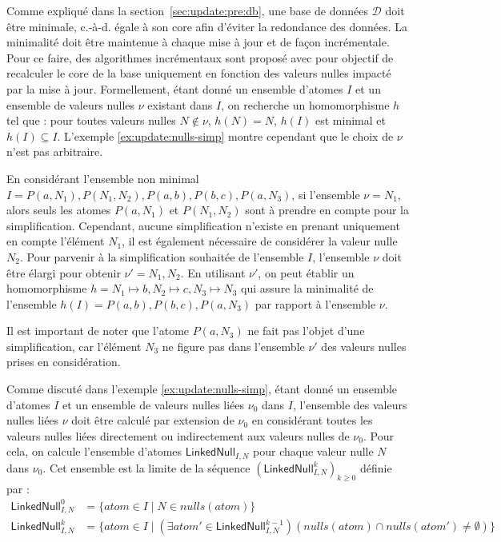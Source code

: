 Comme expliqué dans la section~\ref{sec:update:pre:db}, une base de données $\mathcal{D}$ doit être minimale, c.-à-d. égale à son \gls{core} afin d'éviter la redondance des données.
La minimalité doit être maintenue à chaque mise à jour et de façon incrémentale.
Pour ce faire, des algorithmes incrémentaux sont proposé avec pour objectif de recalculer le \gls{core}  de la base uniquement en fonction des valeurs nulles impacté par la mise à jour.
Formellement, étant donné un ensemble d'atomes $I$ et un ensemble de valeurs nulles $\nu$ existant dans $I$, on recherche un homomorphisme $h$ tel que : pour toutes valeurs nulles $N \notin \nu$, $h(N) = N$, $h(I)$ est minimal et $h(I) \subseteq I$.
L'exemple \ref{ex:update:nulls-simp} montre cependant que le choix de $\nu$ n'est pas arbitraire.

\begin{example}
	\label{ex:update:nulls-simp}
	En considérant l'ensemble non minimal $I = {P(a, N_1), P(N_1, N_2), P(a, b), P(b, c), P(a, N_3)}$, si l'ensemble $\nu = {N_1}$, alors seuls les atomes $P(a, N_1)$ et $P(N_1, N_2)$ sont à prendre en compte pour la simplification.
	Cependant, aucune simplification n'existe en prenant uniquement en compte l'élément $N_1$, il est également nécessaire de considérer la valeur nulle $N_2$.
	Pour parvenir à la simplification souhaitée de l'ensemble $I$, l'ensemble $\nu$ doit être élargi pour obtenir $\nu' = {N_1, N_2}$.
	En utilisant $\nu'$, on peut établir un homomorphisme $h = {N_1 \mapsto b, N_2 \mapsto c, N_3 \mapsto N_3}$ qui assure la minimalité de l'ensemble $h(I) = {P(a, b), P(b, c), P(a, N_3)}$ par rapport à l'ensemble $\nu$.

	Il est important de noter que l'atome $P(a, N_3)$ ne fait pas l'objet d'une simplification, car l'élément $N_3$ ne figure pas dans l'ensemble $\nu'$ des valeurs nulles prises en considération.
\end{example}

Comme discuté dans l'exemple \ref{ex:update:nulls-simp}, étant donné un ensemble d'atomes $I$ et un ensemble de valeurs nulles liées $\nu_0$ dans $I$, l'ensemble des valeurs nulles liées $\nu$ doit être calculé par extension de $\nu_0$ en considérant toutes les valeurs nulles liées directement ou indirectement aux valeurs nulles de $\nu_0$.
Pour cela, on calcule l'ensemble d'atomes $\textsf{LinkedNull}_{I,N}$ pour chaque valeur nulle $N$ dans $\nu_0$.
Cet ensemble est la limite de la séquence $(\textsf{LinkedNull}^k_{I,N})_{k \ge 0}$ définie par :
\begin{align}
	\textsf{LinkedNull}^0_{I,N} & = \{atom \in I \mid N \in nulls(atom)\}                                                                                 \\
	\textsf{LinkedNull}^k_{I,N} & = \{atom \in I \mid (\exists atom' \in \textsf{LinkedNull}^{k-1}_{I,N})(nulls(atom) \cap nulls(atom') \neq \emptyset)\}
\end{align}

